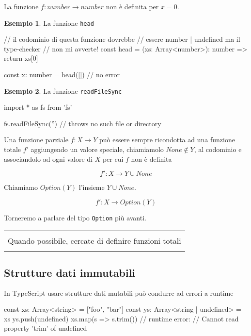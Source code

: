 \documentclass[12pt]{article}
\theoremstyle{definition}
\newtheorem{example}{Esempio}[subsection]
\newenvironment{boxed}
    {\begin{center}
    \begin{tabular}{|p{0.9\textwidth}|}
    \hline\\
    }
    {
    \\\\\hline
    \end{tabular}
    \end{center}
    }
\newenvironment{code}
  {\vspace{0.5cm} \VerbatimEnvironment\begin{typescriptcode}}
  {\end{typescriptcode} \vspace{0.2cm}}
\begin{document}
La funzione $f: number \rightarrow number$ non è definita per $x = 0$.

\begin{example}
La funzione \texttt{head}

\begin{code}
// il codominio di questa funzione dovrebbe
// essere number | undefined ma il type-checker
// non mi avverte!
const head = (xs: Array<number>): number => {
  return xs[0]
}

const x: number = head([]) // no error
\end{code}
\end{example}

\begin{example}
La funzione \texttt{readFileSync}

\begin{code}
import * as fs from 'fs'

fs.readFileSync('') // throws no such file or directory
\end{code}
\end{example}

Una funzione parziale $f: X \rightarrow Y$ può essere sempre ricondotta ad una funzione totale $f'$ aggiungendo un valore speciale,
chiamiamolo $None \notin Y$, al codominio e associandolo ad ogni valore di $X$ per cui $f$ non è definita

$$
f': X \rightarrow Y \cup None
$$

Chiamiamo $Option(Y)$ l'insieme $Y \cup None$.

$$
f': X \rightarrow Option(Y)
$$

Torneremo a parlare del tipo \texttt{Option} più avanti.

\begin{boxed}
Quando possibile, cercate di definire funzioni totali
\end{boxed}

\subsection{Strutture dati immutabili}

In TypeScript usare strutture dati mutabili può condurre ad errori a runtime

\begin{code}
const xs: Array<string> = ["foo", "bar"]
const ys: Array<string | undefined> = xs
ys.push(undefined)
xs.map(s => s.trim())
// runtime error:
// Cannot read property 'trim' of undefined
\end{code}
\end{document}
